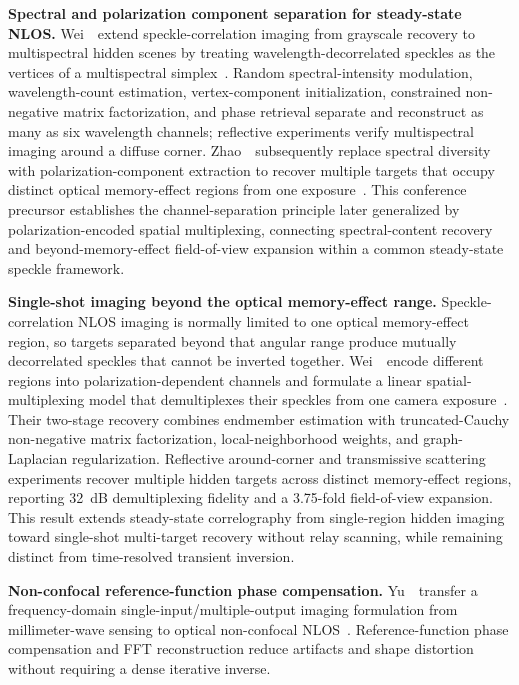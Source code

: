 \vspace{0.8mm}
\noindent \textbf{Spectral and polarization component separation for steady-state NLOS.}
Wei~\etal~extend speckle-correlation imaging from grayscale recovery to multispectral hidden scenes by treating wavelength-decorrelated speckles as the vertices of a multispectral simplex~\cite{weiMultispectralComponentSeparation2024}. Random spectral-intensity modulation, wavelength-count estimation, vertex-component initialization, constrained non-negative matrix factorization, and phase retrieval separate and reconstruct as many as six wavelength channels; reflective experiments verify multispectral imaging around a diffuse corner. Zhao~\etal~subsequently replace spectral diversity with polarization-component extraction to recover multiple targets that occupy distinct optical memory-effect regions from one exposure~\cite{zhaoPolarizationComponentExtraction2025}. This conference precursor establishes the channel-separation principle later generalized by polarization-encoded spatial multiplexing, connecting spectral-content recovery and beyond-memory-effect field-of-view expansion within a common steady-state speckle framework.

\vspace{0.8mm}
\noindent \textbf{Single-shot imaging beyond the optical memory-effect range.}
Speckle-correlation NLOS imaging is normally limited to one optical memory-effect region, so targets separated beyond that angular range produce mutually decorrelated speckles that cannot be inverted together. Wei~\etal~encode different regions into polarization-dependent channels and formulate a linear spatial-multiplexing model that demultiplexes their speckles from one camera exposure~\cite{weiPolarizationSpatialMultiplexing2026}. Their two-stage recovery combines endmember estimation with truncated-Cauchy non-negative matrix factorization, local-neighborhood weights, and graph-Laplacian regularization. Reflective around-corner and transmissive scattering experiments recover multiple hidden targets across distinct memory-effect regions, reporting 32~dB demultiplexing fidelity and a 3.75-fold field-of-view expansion. This result extends steady-state correlography from single-region hidden imaging toward single-shot multi-target recovery without relay scanning, while remaining distinct from time-resolved transient inversion.

\vspace{0.8mm}
\noindent \textbf{Non-confocal reference-function phase compensation.}
Yu~\etal~transfer a frequency-domain single-input/multiple-output imaging formulation from millimeter-wave sensing to optical non-confocal NLOS~\cite{yuFrequencyDomainPhaseNLOS2026}. Reference-function phase compensation and FFT reconstruction reduce artifacts and shape distortion without requiring a dense iterative inverse.

